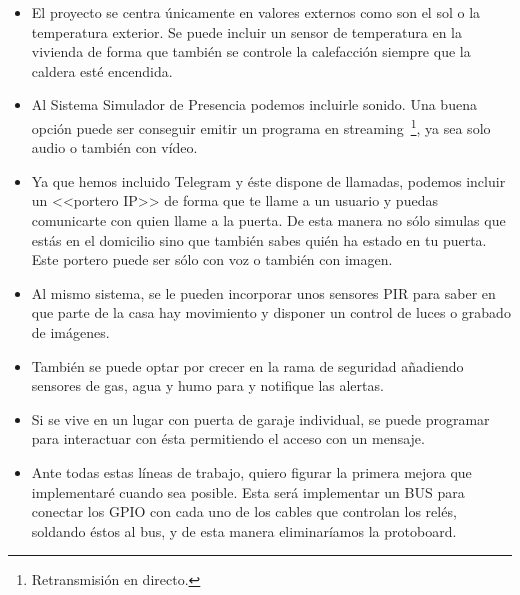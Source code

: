 \begin{itemize}
\item El proyecto se centra únicamente en valores externos como son el sol o la temperatura exterior. Se puede incluir un sensor de temperatura en la vivienda de forma que también se controle la calefacción siempre que la caldera esté encendida.

\item Al Sistema Simulador de Presencia podemos incluirle sonido. Una buena opción puede ser conseguir emitir un programa en streaming~\footnote{Retransmisión en directo.}, ya sea solo audio o también con vídeo.

\item Ya que hemos incluido Telegram y éste dispone de llamadas, podemos incluir un <<portero IP>> de forma que te llame a un usuario y puedas comunicarte con quien llame a la puerta. De esta manera no sólo simulas que estás en el domicilio sino que también sabes quién ha estado en tu puerta. Este portero puede ser sólo con voz o también con imagen.

\item Al mismo sistema, se le pueden incorporar unos sensores PIR para saber en que parte de la casa hay movimiento y disponer un control de luces o grabado de imágenes.

\item También se puede optar por crecer en la rama de seguridad añadiendo sensores de gas, agua y humo para y notifique las alertas.

\item Si se vive en un lugar con puerta de garaje individual, se puede programar para interactuar con ésta permitiendo el acceso con un mensaje.

\item Ante todas estas líneas de trabajo, quiero figurar la primera mejora que implementaré cuando sea posible. Esta será implementar un BUS para conectar los GPIO con cada uno de los cables que controlan los relés, soldando éstos al bus, y de esta manera eliminaríamos la protoboard.

\end{itemize}
